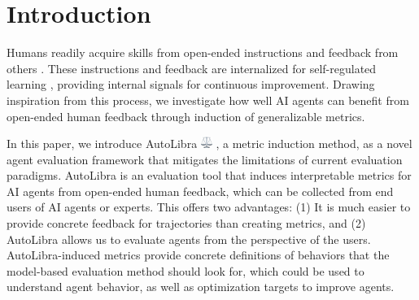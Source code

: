 \documentclass[../main.tex]{subfiles}
\begin{document}
\section{Introduction}

Humans readily acquire skills from open-ended instructions and feedback from others
\citep{tomasello1993cultural}. These instructions and feedback are internalized for
self-regulated learning \citep{pintrich2002development,nicol2006formative}, providing
internal signals for continuous improvement. Drawing inspiration from this
process, we investigate how well AI agents can benefit from open-ended human feedback
through induction of generalizable metrics.


In this paper, we introduce AutoLibra \protect
\includegraphics[height=1em]{figs/scale.png}
, a metric induction method, as a novel agent evaluation framework that
mitigates the limitations of current evaluation paradigms. AutoLibra is an evaluation
tool that induces interpretable metrics for AI agents from open-ended human feedback,
which can be collected from end users of AI agents or experts. This offers two advantages:
(1) It is much easier to provide concrete feedback for trajectories than
creating metrics, and (2) AutoLibra allows us to evaluate agents from the perspective
of the users. AutoLibra-induced metrics provide concrete definitions of
behaviors that the model-based evaluation method should look for, which could be
used to understand agent behavior, as well as optimization targets to improve
agents.
\end{document}
